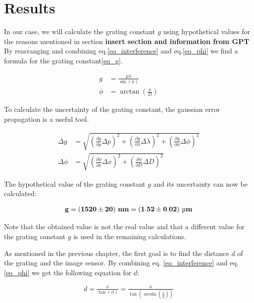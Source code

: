 \section{Results}\label{sec_results}

In our case, we will calculate the grating constant $g$ using hypothetical values for the reasons mentioned in section \textbf{insert section and information from GPT}
By rearranging and combining eq.\ref{eq_interference} and eq.\ref{eq_phi} we find a formula for the grating constant\ref{eq_g}.

\begin{align}
    g &= \frac{p \lambda}{\sin(\phi)} \label{eq_g}\\
    \phi &= \arctan \left( \frac{x}{D} \right)
\end{align}

To calculate the uncertainty of the grating constant, the gaussian error propagation is a useful tool.

\begin{align}
    \Delta g &= \sqrt{\left( \frac{\partial g}{\partial p} \Delta p \right)^2 + \left( \frac{\partial g}{\partial \lambda} \Delta \lambda \right)^2 + \left( \frac{\partial g}{\partial \phi} \Delta \phi \right)^2}\\
    \Delta \phi &= \sqrt{\left( \frac{\partial \phi}{\partial x} \Delta x \right)^2 + \left( \frac{\partial \phi}{\partial D} \Delta D \right)^2}
\end{align}

The hypothetical value of the grating constant $g$ and its uncertainty can now be calculated:

\begin{align}
    \bf g = (1520 \pm 20) ~\si{\bf\nano\meter} = (1.52 \pm 0.02) ~\si{\bf\micro\meter} \label{res_g}
\end{align}

Note that the obtained value is not the real value and that a different value for the grating constant $g$ \cite{src_grating_constant} is used in the remaining calculations.

As mentioned in the previous chapter, the first goal is to find the distance $d$ of the grating
and the image sensor.
By combining eq. \ref{eq_interference} and eq. \ref{eq_phi} we get the following equation for $d$:

\begin{align}
    d = \frac{x}{\tan(\phi)} = \frac{x}{\tan(\arcsin(\frac{\lambda}{g}))} \label{eq_distance}
\end{align}

